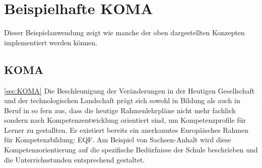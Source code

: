 \documentclass[
12pt,
english,
ngerman,
headsepline,
twoside,
openright,
numbers=noenddot,version=first
]{scrreprt}
\begin{document}







\chapter{Beispielhafte KOMA}

Dieser Beispielanwendung zeigt wie manche der oben dargestellten Konzepten implementiert werden können.

\section{KOMA}
\label{sec:KOMA} \autoref{sec:KOMA}
Die Beschleunigung der Veränderungen in der Heutigen Gesellschaft und der technologischen Landschaft prägt sich sowohl in Bildung als auch in Beruf in so fern aus, dass die heutige Rahmenlehrpläne nicht mehr fachlich sondern nach Kompetenzentwicklung orientiert sind, um Kompetenzprofile für Lerner zu gestallten. Es existiert bereits ein anerkanntes Europäisches Rahmen für Kompetenzbildung: \acrfull{EQF}. Am Beispiel von Sachsen-Anhalt\cite{BildungsServerSachsen} wird diese Kompetenzorientierung auf die spezifische Bedürfnisse der Schule beschrieben und die Unterrichsstunden entsprechend gestaltet.
\end{document}
